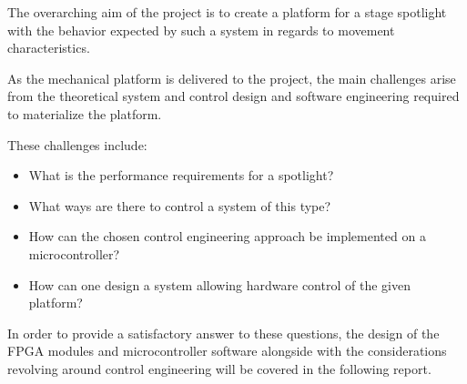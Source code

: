 \documentclass[../../main]{subfiles}
\begin{document}
The overarching aim of the project is to create a platform for a stage spotlight with the behavior expected by such a system in regards to movement characteristics. 

As the mechanical platform is delivered to the project, the main challenges arise from the theoretical system and control design and software engineering required to materialize the platform.

These challenges include:

\begin{itemize}
    \item What is the performance requirements for a spotlight?
    \item What ways are there to control a system of this type?
    \item How can the chosen control engineering approach be implemented on a microcontroller?
    \item How can one design a system allowing hardware control of the given platform?
\end{itemize}

In order to provide a satisfactory answer to these questions, the design of the FPGA modules and microcontroller software alongside with the considerations revolving around control engineering will be covered in the following report.
\end{document}
